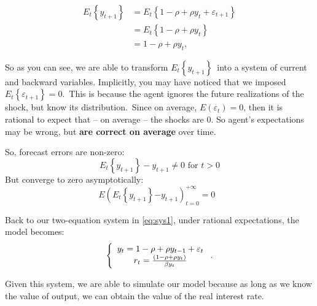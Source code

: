 \documentclass[a4paper,12pt]{article}%
\begin{document}
\begin{align*}
E_{t}\left\{  y_{t+1}\right\}   &  =E_{t}\left\{  1-\rho+\rho y_{t}%
+\varepsilon_{t+1}\right\} \\
&  =E_{t}\left\{  1-\rho+\rho y_{t}\right\} \\
&  =1-\rho+\rho y_{t},
\end{align*}


So as you can see, we are able to transform $E_{t}\left\{  y_{t+1}\right\}
$\ into a system of current and backward variables. Implicitly, you may have
noticed that we imposed $E_{t}\left\{  \varepsilon_{t+1}\right\}  =0$.\ This
is because the agent ignores the future realizations of the shock, but know
its distribution.\ Since on average, $E(\varepsilon_{t})=0$, then it is
rational to expect that -- on average -- the shocks are 0. So agent's
expectations may be wrong, but \textbf{are correct on average} over time.

So, forecast errors are non-zero:%
\[
E_{t}\left\{  y_{t+1}\right\}  -y_{t+1}\neq0\text{ for }t>0
\]
But converge to zero asymptotically:%
\[
E\left(  E_{t}\left\{  y_{t+1}\right\}  \overset{}{-}y_{t+1}\right)
_{t=0}^{+\infty}=0\text{ }%
\]


Back to our two-equation system in \autoref{eq:sys1}, under rational
expectations, the model becomes:%
\begin{equation}
\left\{
\begin{array}
[c]{c}%
y_{t}=1-\rho+\rho y_{t-1}+\varepsilon_{t}\\
r_{t}=\frac{\left(  1-\rho+\rho y_{t}\right)  }{\beta y_{t}}%
\end{array}
\right.  .\label{eq:sys2}%
\end{equation}


Given this system, we are able to simulate our model because as long as we
know the value of output, we can obtain the value of the real interest rate.%
\end{document}
